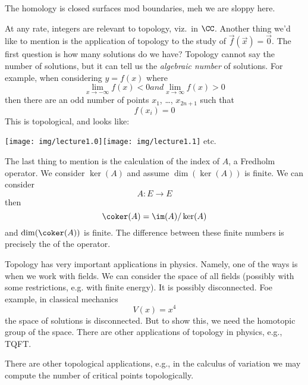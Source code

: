 The homology is closed surfaces mod boundaries, meh we are sloppy
here.

At any rate, integers are relevant to topology, viz.\ in
$\CC$. Another thing we'd like to mention is the application
of topology to the study of $\vec{f}(\vec{x})=\vec{0}$. The first
question is how many solutions do we have? Topology cannot say
the number of solutions, but it can tell us the \emph{algebraic
  number} of solutions. For example, when considering $y=f(x)$
where
\begin{subequations}
\begin{equation}
\lim_{x\to-\infty}f(x)<0
\end{equation}
and
\begin{equation}
\lim_{x\to\infty}f(x)>0
\end{equation}
\end{subequations}
then there are an odd number of points $x_{1}$, \dots, $x_{2n+1}$
such that 
\begin{equation}
f(x_{i})=0
\end{equation}
This is topological, and looks like:
\begin{center}
\texttt{[image: img/lecture1.0]}\quad\texttt{[image: img/lecture1.1]}\quad
etc.
\end{center}

The last thing to mention is the calculation of the index of $A$,
a Fredholm operator. We consider $\ker(A)$ and assume
$\dim(\ker(A))$ is finite. We can consider
\begin{equation}
A\colon E\to E
\end{equation}
then
\begin{equation}
\coker(A)=\im(A)/\ker(A)
\end{equation}
and $\dim(\coker(A))$ is finite. The difference between these
finite numbers is precisely the  of the operator.

Topology has very important applications in physics. Namely, one
of the ways is when we work with fields. We can consider the
space of all fields (possibly with some restrictions, e.g. with
finite energy). It is possibly disconnected. Foe example, in
classical mechanics
\begin{equation}
V(x)=x^{4}
\end{equation}
the space of solutions is disconnected. But to show this, we need
the homotopic group of the space. There are other applications of
topology in physics, e.g., TQFT.

There are other topological applications, e.g., in the calculus
of variation we may compute the number of critical points
topologically. 
